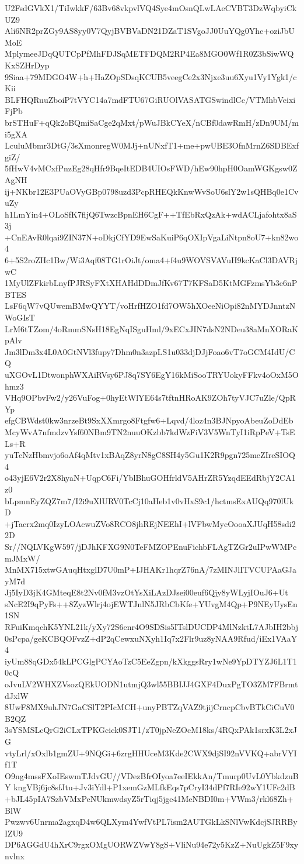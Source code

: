 U2FsdGVkX1/TiIwkkF/63Bv68vkpvlVQ4Sye4mOsnQLwLAeCVBT3DzWqbyiCkUZ9
Ali6NR2prZGy9AS8yy0V7QyjBVBVaDN21DZaT1SVgoJJ0UuYQg0Yhc+oziJbUMoE
MplymeeJDqQUTCpPfMhFDJSqMETFDQM2RP4Ea8MGO0Wf1R0Z3bSiwWQKxSZHrDyp
9Siaa+79MDGO4W+h+HaZOpSDsqKCUB5veegCe2x3Njxe3uu6Xyu1Vy1Ygk1/cKii
BLFHQRuuZboiP7tVYC14a7mdFTU67GiRUOlVASATGSwindlCc/VTMhbVeixiFjPb
brSTHuF+qQk2oBQmiSaCge2qMxt/pWuJBkCYeX/nCBf0dawRmH/zDn9UM/mi5gXA
LculuMbmr3DtG/3sXmonregW0MJj+nUNxfT1+me+pwUBE3OfnMrnZ6SDBExfgiZ/
5fHwV4vMCxfPnzEg28qHfr9BqeItEDB4UIOsFWD/hEw90hpH0OamWGKgsw0ZAgNH
ij+NKbr12E3PUaOVyGBp0798uzd3PcpRHEQkKnwWvSoU6slY2w1sQHBq0e1CvuZy
h1LmYin4+OLoSfK7fljQ6TwzcBpnEH6CgF++TfEbRxQzAk+wdACLjafohtx8aS3j
+CnEAvR0lqai9ZIN37N+oDkjCfYD9EwSaKuiP6qOXIpVgaLiNtpn8oU7+kn82wo4
6+5S2roZHc1Bw/Wi3Aqf08TG1rOiJt/oma4+f4u9WOVSVAVuH9kcKaCl3DAVRjwC
1MyUlZFkirbLnyfPJRSyFXtXHAHdDDmJfKv67T7KFSaD5KtMGFzmsYb3e6nPBTES
LsF6qW7vQUwemBMwQYYT/voHrfHZO1fd7OW5hXOeeNiOpi82nMYDJnntzNWoGIsT
LrM6tTZom/4oRmmSNsH18EgNqISguHml/9xECxJIN7dsN2NDeu38aMnXORaKpAlv
Jm3lDm3x4L0A0GtNVl3fupy7Dhm0n3azpLS1u033djDJjFoao6vT7oGCM4IdU/CQ
uXGOvL1DtwonphWXAiRVsy6PJ8q7SY6EgY16kMiSooTRYUokyFFkv4oOxM5Ohmz3
VHq9OPbvFw2/y26VuFog+0hyEtWlYE64s7tftnHRoAK9ZOh7tyVJC7uZle/QpRYp
efgCBWdst0kw3nrzeBt9SxXXmrgo8Ftgfw6+Lqvd/4loz4n3BJNpyoAbeuZoDdEb
McyWvA7nfmdzvYsf60NBm9TN2nuuOKzbb7kdWzFiV3V5WnTyI1iRpPeV+TsELs+R
yuTcNzHbmvjo6oAf4qMtv1xBAqZ8yrN8gC8SH4y5Gu1K2R9pgn725meZIreSIOQ4
o43yjE6V2r2X8hyaN+UqpC6Fi/YblBhuGOHfrldV5AHrZR5YzqdEEdRbjY2CA1z0
bLpmnEyZQZ7m7/I2i9uXlURV0TcCj10aHeb1v0vHxS9c1/hctmsExAUQq970lUkD
+jTacrx2mq0IzyLOAcwuZVo8RCO8jhREjNEEhI+lVFbwMycOooaXJUqH58sdi22D
Sr//NQLVKgW597/jDJhKFXG9N0TeFMZOPEnuFichbFLAgTZGr2uIPwWMPcmJMxW/
MnMX715xtwGAuqHtxglD7U0mP+IJHAKr1hqrZ76nA/7zMINJlITVCUPAaGJayM7d
Jj5IyD3jK4GMteqE8t2Nv0fM3vzOtYsXiLAzDJsei00euf6Qjy8yWLyjIOuJ6+Ut
sNcE2I9qPyFs++8ZyzWlrj4ojEWTJnlN5JRbCbKfe+YUvgM4Qp+P9NEyUysEn1SN
RFuiKmqchK5YNL21k/yXy72S6enr4O9SDSis5ITslDUCDP4MlNzktL7AJbIH2bbj
0sPcpa/geKCBQOFvzZ+dP2qCewxuNXyh1Iq7x2Flr9uz8yNAA9Rfud/iEx1VAaY4
iyUm88qGDx54kLPCGlgPCYAoTzC5EeZgpn/kXkggsRry1wNe9YpDTYZJ6L1T10cQ
oJvuLV2WHXZVsozQEkUODN1utmjQ3wl55BBIJJ4GXF4DuxPgTO3ZM7FBrmtdJxlW
8UwF8MX9uhJN7GaCSlT2PIcMCH+unyPBTZqVAZ9tjijCrncpCbvBTkCiCuV0B2QZ
3sYSMSLcQrG2iCLxTPKGcick0SJT1/zT0jpNeZOcM18ks/4RQxPAk1srxK3L2xJG
vtyLrl/xOxlb1gmZU+9NQGi+6zrgHHUceM3Kde2CWX9djSI92nVVKQ+abrVYIf1T
O9ng4mssFXoIEswmTJdvGU//VDezBfrOIyoa7eeIEkkAn/Tmurp0UvL0YbkdzuBY
kngVBj6jc8sfJtu+Jv3iYdl+P1xemGzMLfkEqs7pCryI34dPf7RIe92wY1UFc2dB
+bJL45pIA7SzbVMxPeNUkmwdsyZ5rTiqj5jge41MeNBDI0m+VWm3/rkl68Zh+BlW
Pwzwv6Unrma2agxqD4w6QLXym4YwfVtPL7ism2AUTGkLkSNlVwKdcjSJRRByIZU9
DP6AGGdU4hXrC9rgxOMgUORWZVwY8gS+VliNu94e72y5KzZ+NuUgkZ5F9xynvlnx
